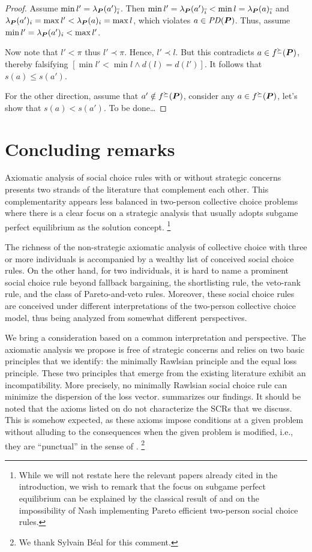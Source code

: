 \documentclass[version=3.21, pagesize, twoside=off, bibliography=totoc, DIV=calc, fontsize=12pt, a4paper]{scrartcl}
\begin{document}
\begin{proof}
	Assume $\min l' = \lprof(a')_{\ibar}$.
	Then $\min l' = \lprof(a')_{\ibar} < \min l = \lprof(a)_{\ibar}$ and $\lprof(a')_i = \max l' < \lprof(a)_i = \max l$, which violates $a \in \mathit{PD}(\bm{P})$. Thus, assume $\min l' = \lprof(a')_i < \max l'$.
	
	Now note that $l' < \pi$ thus $l' \prec \pi$. Hence, $l' \prec l$.
	But this contradicts $a \in f^\succeq(\bm{P})$, thereby falsifying $[\min l' < \min l \land d(l) = d(l')]$.
	It follows that $s(a) ≤ s(a')$.

	For the other direction, assume that $a' \notin f^\succeq(\bm{P})$, consider any $a \in f^\succeq(\bm{P})$, let’s show that $s(a) < s(a')$.
	To be done…
\end{proof}
	
\section{Concluding remarks}
\label{sec:concl}
Axiomatic analysis of social choice rules with or without strategic concerns presents two strands of the literature that complement each other. This complementarity appears less balanced in two-person collective choice problems where there is a clear focus on a strategic analysis that usually adopts subgame perfect equilibrium as the solution concept.%
\footnote{While we will not restate here the relevant papers already cited in the introduction, we wish to remark that the focus on subgame perfect equilibrium can be explained by the classical result of \citet{HurwiczSchmeidler78} and \citet{Maskin99} on the impossibility of Nash implementing Pareto efficient two-person social choice rules.} 

The richness of the non-strategic axiomatic analysis of collective choice with three or more individuals is accompanied by a wealthy list of conceived social choice rules. On the other hand, for two individuals, it is hard to name a prominent social choice rule beyond fallback bargaining, the shortlisting rule, the veto-rank rule, and the class of Pareto-and-veto rules. Moreover, these social choice rules are conceived under different interpretations of the two-person collective choice model, thus being analyzed from somewhat different perspectives.

We bring a consideration based on a common interpretation and perspective. The axiomatic analysis we propose is free of strategic concerns and relies on two basic principles that we identify: the minimally Rawlsian principle and the equal loss principle. These two principles that emerge from the existing literature exhibit an incompatibility. More precisely, no minimally Rawlsian social choice rule can minimize the dispersion of the loss vector.
 summarizes our findings. It should be noted that the axioms listed on  do not characterize the SCRs that we discuss. This is somehow expected, as these axioms impose conditions at a given problem without alluding to the consequences when the given problem is modified, i.e., they are “punctual” in the sense of \citet{thomson2012axiomatics}.%
\footnote{We thank Sylvain Béal for this comment.}
\end{document}
